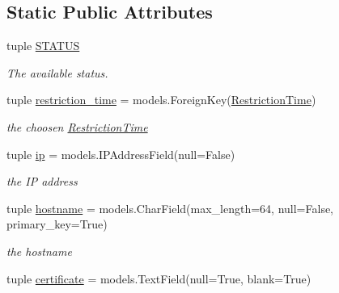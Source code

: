 \subsection*{Static Public Attributes}
\begin{DoxyCompactItemize}
\item 
tuple \hyperlink{classrestriction__system_1_1models_1_1Workstation_a7e10695b3519a406f1c6f605abd10573}{S\+T\+A\+T\+U\+S}
\begin{DoxyCompactList}\small\item\em The available status. \end{DoxyCompactList}\item 
\hypertarget{classrestriction__system_1_1models_1_1Workstation_a9b5e1072fbd2e31a7851949b96c6a049}{}tuple \hyperlink{classrestriction__system_1_1models_1_1Workstation_a9b5e1072fbd2e31a7851949b96c6a049}{restriction\+\_\+time} = models.\+Foreign\+Key(\hyperlink{classrestriction__system_1_1models_1_1RestrictionTime}{Restriction\+Time})\label{classrestriction__system_1_1models_1_1Workstation_a9b5e1072fbd2e31a7851949b96c6a049}

\begin{DoxyCompactList}\small\item\em the choosen \hyperlink{classrestriction__system_1_1models_1_1RestrictionTime}{Restriction\+Time} \end{DoxyCompactList}\item 
\hypertarget{classrestriction__system_1_1models_1_1Workstation_abd7d81ee0e12b1e4841e6f8340703de8}{}tuple \hyperlink{classrestriction__system_1_1models_1_1Workstation_abd7d81ee0e12b1e4841e6f8340703de8}{ip} = models.\+I\+P\+Address\+Field(null=False)\label{classrestriction__system_1_1models_1_1Workstation_abd7d81ee0e12b1e4841e6f8340703de8}

\begin{DoxyCompactList}\small\item\em the I\+P address \end{DoxyCompactList}\item 
\hypertarget{classrestriction__system_1_1models_1_1Workstation_a4d3c812255763cb1052fe2d8452c0358}{}tuple \hyperlink{classrestriction__system_1_1models_1_1Workstation_a4d3c812255763cb1052fe2d8452c0358}{hostname} = models.\+Char\+Field(max\+\_\+length=64, null=False, primary\+\_\+key=True)\label{classrestriction__system_1_1models_1_1Workstation_a4d3c812255763cb1052fe2d8452c0358}

\begin{DoxyCompactList}\small\item\em the hostname \end{DoxyCompactList}\item 
\hypertarget{classrestriction__system_1_1models_1_1Workstation_a0058ec136d9f0fd305a8be854be48981}{}tuple \hyperlink{classrestriction__system_1_1models_1_1Workstation_a0058ec136d9f0fd305a8be854be48981}{certificate} = models.\+Text\+Field(null=True, blank=True)\label{classrestriction__system_1_1models_1_1Workstation_a0058ec136d9f0fd305a8be854be48981}


\end{DoxyCompactItemize}
